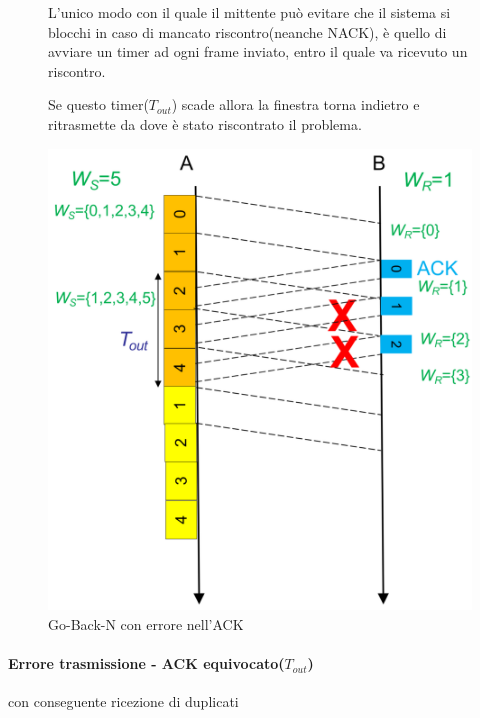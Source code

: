 \begin{figure}[htbp]
    \centering
    \begin{minipage}{0.55\textwidth}
        L'unico modo con il quale il mittente può evitare che il sistema si blocchi in caso di mancato riscontro(neanche NACK),  è quello di avviare un timer ad ogni frame inviato, entro il quale va ricevuto un riscontro.
        
        Se questo timer($T_{out}$) scade allora la finestra torna indietro e ritrasmette da dove è stato riscontrato il problema.
    \end{minipage}%
    \hfill
    \begin{minipage}{0.4\textwidth}
        \includegraphics[width=\linewidth]{images/gobacknerroreack.png}
        \caption{Go-Back-N con errore nell'ACK}
    \end{minipage}
\end{figure}

\newpage

\paragraph{Errore trasmissione - ACK equivocato($T_{out}$)} 
con conseguente ricezione di duplicati

